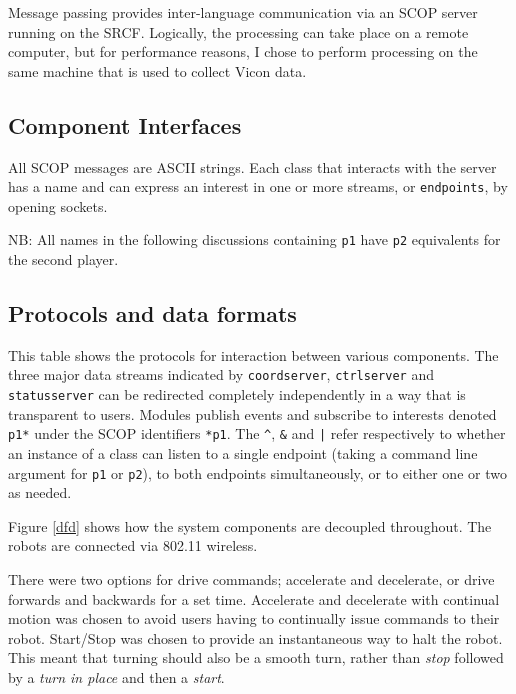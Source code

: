 \documentclass[12pt,a4,notitlepage]{report}
\renewcommand{\_}{\texttt{\symbol{95}}}
\newcommand{\<}{\texttt{\symbol{60}}}
\renewcommand{\>}{\texttt{\symbol{62}}}
\newcommand{\scopendpoint}[1]{\texttt{#1}}
\newcommand{\variable}[1]{\texttt{#1}}
\begin{document}
Message passing provides inter-language communication via an SCOP server running on the SRCF. Logically, the processing can take place on a remote computer, but for performance reasons, I chose to perform processing on the same machine that is used to collect Vicon data.

\subsection{Component Interfaces}

All SCOP messages are ASCII strings. Each class that interacts with the server has a name and can express an interest in one or more streams, or \scopendpoint{endpoints}, by opening sockets.

NB: All names in the following discussions containing \verb^p1^ have \verb^p2^ equivalents for the second player.

\subsection{Protocols and data formats}

This table shows the protocols for interaction between various components. The three major data streams indicated by \scopendpoint{coordserver}, \scopendpoint{ctrlserver} and \scopendpoint{statusserver} can be redirected completely independently in a way that is transparent to users. Modules publish events and subscribe to interests denoted \scopendpoint{p1*} under the SCOP identifiers \variable{*p1}. The \verb#^#, \verb#&# and \verb#|# refer respectively to whether an instance of a class can listen to a single endpoint (taking a command line argument for \scopendpoint{p1} or \scopendpoint{p2}), to both endpoints simultaneously, or to either one or two as needed. 

Figure \ref{dfd} shows how the system components are decoupled throughout. The robots are connected via 802.11 wireless.

There were two options for drive commands; accelerate and decelerate, or drive forwards and backwards for a set time. Accelerate and decelerate with continual motion was chosen to avoid users having to continually issue commands to their robot. Start/Stop was chosen to provide an instantaneous way to halt the robot. This meant that turning should also be a smooth turn, rather than {\em stop} followed by a {\em turn in place} and then a {\em start}. 
\end{document}
